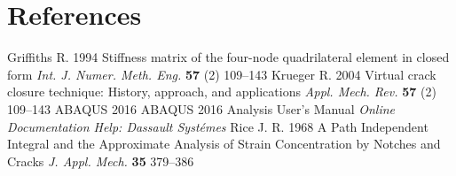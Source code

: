 \documentclass[a4paper]{jpconf}
\begin{document}



\section*{References}
\begin{thebibliography}{9}
Griffiths  R. 1994 Stiffness matrix of the four-node quadrilateral element in closed form {\it Int. J. Numer. Meth. Eng.} {\bf 57} (2) 109--143
Krueger R. 2004 Virtual crack closure technique: History, approach, and applications {\it Appl. Mech. Rev.} {\bf 57} (2) 109--143
 ABAQUS 2016 ABAQUS 2016 Analysis User's Manual {\it Online Documentation Help: Dassault Syst\'emes}
Rice J. R. 1968 A Path Independent Integral and the Approximate Analysis of Strain Concentration by Notches and Cracks {\it J. Appl. Mech.} {\bf 35} 379--386

\end{thebibliography}

\end{document}
